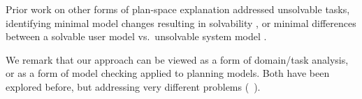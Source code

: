 Prior work on other forms of plan-space explanation addressed
unsolvable tasks, identifying minimal model changes resulting in
solvability \cite{goebelbecker:etal:icaps-10}, or minimal differences
between a solvable user model vs.\ unsolvable system model
\cite{sreedharan:etal:ijcai-19}.
%
%

We remark that our approach can be viewed as a form of domain/task
analysis, or as a form of model checking applied to planning
models. Both have been explored before, but addressing very different
problems
(\eg\ \cite{fox:long:jair-98,rintanen:aaai-00,vaquero:etal:keq-13}).
%
%



















